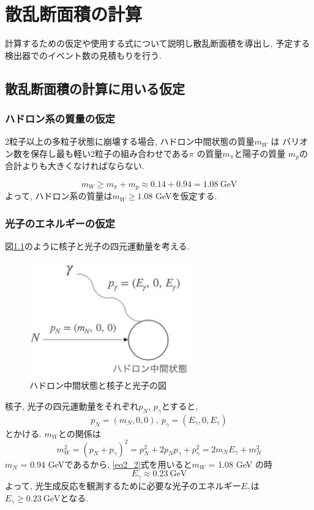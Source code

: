 \chapter{散乱断面積の計算} \label{cha:cross_section}
計算するための仮定や使用する式について説明し散乱断面積を導出し, 予定する検出器でのイベント数の見積もりを行う.

\section{散乱断面積の計算に用いる仮定}
\subsection{ハドロン系の質量の仮定}
2粒子以上の多粒子状態に崩壊する場合, ハドロン中間状態の質量$m_W$ は バリオン数を保存し最も軽い2粒子の組み合わせである$\pi$ の質量$m_\pi$と陽子の質量 $m_p$の合計よりも大きくなければならない.

\begin{equation}
    m_W \geq m_\pi + m_p \approx 0.14 + 0.94 = 1.08 \ \mathrm{GeV}
\end{equation}
よって, ハドロン系の質量は$m_W \geq 1.08$ GeVを仮定する.

\subsection{光子のエネルギーの仮定}
図\ref{fig:sigma1}のように核子と光子の四元運動量を考える.
\begin{figure}[H]
    \centering
    \includegraphics[height=5cm]{img/diagram_momentum.png}
    \caption{ハドロン中間状態と核子と光子の図}
    \label{fig:sigma1}
\end{figure}
核子, 光子の四元運動量をそれぞれ$p_N$, $p_\gamma$とすると,
\begin{equation}
    p_N = (m_N, 0, 0),\  p_\gamma = (E_\gamma, 0,  E_\gamma)
\end{equation}
とかける.
$m_W$との関係は
\begin{equation}
    \label{eq2_2}
    m_W^2 = (p_N + p_\gamma)^2 = p_N^2 + 2p_N p_\gamma + p_\gamma^2
    = 2m_N E_\gamma + m_N^2
\end{equation}
$m_N$ = 0.94 GeVであるから, \ref{eq2_2}式を用いると$m_W$ = 1.08 GeV の時
\begin{equation}
    E_\gamma \approx 0.23 \ \mathrm{GeV}
\end{equation}
よって, 光生成反応を観測するために必要な光子のエネルギー$E_\gamma$は
$E_\gamma \geq 0.23 \ \mathrm{GeV}$となる.


